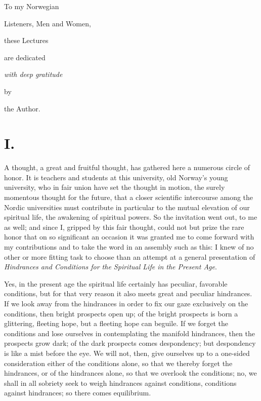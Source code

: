\documentclass[12pt]{book}
\newcommand{\opage}[1]{\marginnote{\footnotesize\textit{[#1]}}}
\begin{document}
\cleardoublepage
\thispagestyle{empty}
\vspace*{\fill}
\begin{center}
To my Norwegian\par
\bigskip
{\Large Listeners, Men and Women,}\par
\medskip
{\large these Lectures}\par
\medskip
{\small are dedicated}\par
\bigskip
\emph{with deep gratitude}\par
\bigskip
by\par
\bigskip
the Author.\par
\end{center}
\vspace*{\fill}
\cleardoublepage

\tableofcontents

\mainmatter

\chapter*{I.}
\label{ch:i}
\opage{1}\setcounter{footnote}{0}%
A thought, a great and fruitful thought, has gathered here a numerous
circle of honor. It is teachers and students at this university, old
Norway's young university, who in fair union have set the thought in
motion, the surely momentous thought for the future, that a closer
scientific intercourse among the Nordic universities must contribute in
particular to the mutual elevation of our spiritual life, the awakening
of spiritual powers. So the invitation went out, to me as well; and
since I, gripped by this fair thought, could not but prize the rare
honor that on so significant an occasion it was granted me to come
forward with my contributions and to take the word in an assembly such
as this: I knew of no other or more fitting task to choose than an
attempt at a general presentation of \emph{Hindrances and Conditions
for the Spiritual Life in the Present Age}.

Yes, in the present age the spiritual life certainly has peculiar,
favorable conditions, but for that very reason it also meets great and
peculiar hindrances. If we look away from the hindrances in order to fix
our gaze exclusively on
\opage{2}\setcounter{footnote}{0}%
the conditions, then bright prospects open up; of the bright prospects
is born a glittering, fleeting hope, but a fleeting hope can beguile. If
we forget the conditions and lose ourselves in contemplating the manifold
hindrances, then the prospects grow dark; of the dark prospects comes
despondency; but despondency is like a mist before the eye. We will not,
then, give ourselves up to a one-sided consideration either of the
conditions alone, so that we thereby forget the hindrances, or of the
hindrances alone, so that we overlook the conditions; no, we shall in
all sobriety seek to weigh hindrances against conditions, conditions
against hindrances; so there comes equilibrium.
\end{document}
